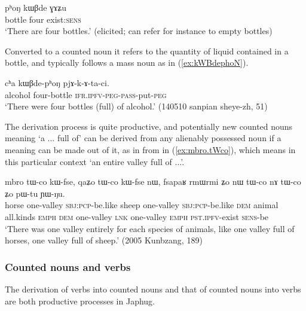 \begin{exe}
\ex \label{ex:phoN}
\gll  pʰoŋ kɯβde ɣɤʑu \\
bottle four exist:\textsc{sens} \\
\glt `There are four bottles.' (elicited; can refer for instance to empty bottles)
\end{exe}

Converted to a counted noun  it refers to the quantity of liquid contained in a bottle, and typically follows a mass noun as in (\ref{ex:kWBdephoN}).

\begin{exe}
\ex \label{ex:kWBdephoN}
\gll cʰa kɯβde-pʰoŋ pjɤ-k-ɤ-ta-ci. \\
alcohol four-bottle \textsc{ifr}.\textsc{ipfv}-\textsc{peg}-\textsc{pass}-put-\textsc{peg} \\
\glt  `There were four bottles (full) of alcohol.' (140510 sanpian sheye-zh, 51)
\end{exe}

The derivation process is quite productive, and potentially new counted nouns meaning `a ... full of' can be derived from any alienably possessed noun if a meaning can be made out of it, as in  from  in (\ref{ex:mbro.tWco}), which means in this particular context `an entire valley full of ...'.
 
 \begin{exe}
\ex \label{ex:mbro.tWco}
 \gll  mbro tɯ-co kɯ-fse, qaʑo tɯ-co kɯ-fse nɯ, fsapaʁ rmɯrmi ʑo nɯ tɯ-co nɤ tɯ-co ʑo pɯ-tu ɲɯ-ŋu. \\
 horse one-valley \textsc{sbj}:\textsc{pcp}-be.like  sheep one-valley \textsc{sbj}:\textsc{pcp}-be.like \textsc{dem} animal all.kinds \textsc{emph} \textsc{dem}  one-valley \textsc{lnk}  one-valley \textsc{emph} \textsc{pst}.\textsc{ipfv}-exist \textsc{sens}-be \\
 \glt `There was one valley entirely for each species of animals, like one valley full of horses, one valley full of sheep.' (2005 Kunbzang, 189)
 \end{exe}
 
\subsubsection{Counted nouns and verbs}   \label{sec:CN.verbs}
The derivation of verbs into counted nouns and that of counted nouns into verbs are both productive processes in Japhug. 

